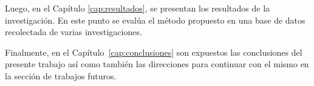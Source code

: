 Luego, en el Capítulo  \ref{cap:resultados}, se presentan los resultados de la investigación. En este punto se evalúa el método propuesto en una base de datos recolectada de varias investigaciones.

Finalmente, en el Capítulo~\ref{cap:conclusiones} son expuestos las conclusiones del presente trabajo así como también las direcciones para continuar con el mismo en la sección de trabajos futuros.






